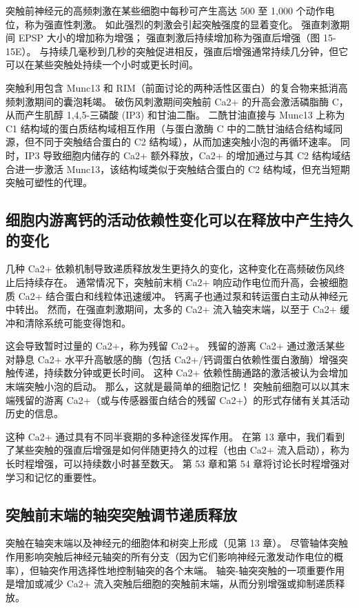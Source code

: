 突触前神经元的高频刺激在某些细胞中每秒可产生高达 500 至 1,000 个动作电位，称为强直性刺激。 如此强烈的刺激会引起突触强度的显着变化。 强直刺激期间 EPSP 大小的增加称为增强； 强直刺激后持续增加称为强直后增强（图 15-15E）。 与持续几毫秒到几秒的突触促进相反，强直后增强通常持续几分钟，但它可以在某些突触处持续一个小时或更长时间。

突触利用包含 Munc13 和 RIM（前面讨论的两种活性区蛋白）的复合物来抵消高频刺激期间的囊泡耗竭。 破伤风刺激期间突触前 Ca2+ 的升高会激活磷脂酶 C，从而产生肌醇 1,4,5-三磷酸 (IP3) 和甘油二酯。 二酰甘油直接与 Munc13 上称为 C1 结构域的蛋白质结构域相互作用（与蛋白激酶 C 中的二酰甘油结合结构域同源，但不同于突触结合蛋白的 C2 结构域），从而加速突触小泡的再循环速率。 同时，IP3 导致细胞内储存的 Ca2+ 额外释放，Ca2+ 的增加通过与其 C2 结构域结合进一步激活 Munc13，该结构域类似于突触结合蛋白的 C2 结构域，但充当短期突触可塑性的代理。

\subsection{细胞内游离钙的活动依赖性变化可以在释放中产生持久的变化}
几种 Ca2+ 依赖机制导致递质释放发生更持久的变化，这种变化在高频破伤风终止后持续存在。 通常情况下，突触前末梢 Ca2+ 响应动作电位而升高，会被细胞质 Ca2+ 结合蛋白和线粒体迅速缓冲。 钙离子也通过泵和转运蛋白主动从神经元中转出。 然而，在强直刺激期间，太多的 Ca2+ 流入轴突末端，以至于 Ca2+ 缓冲和清除系统可能变得饱和。

这会导致暂时过量的 Ca2+，称为残留 Ca2+。 残留的游离 Ca2+ 通过激活某些对静息 Ca2+ 水平升高敏感的酶（包括 Ca2+/钙调蛋白依赖性蛋白激酶）增强突触传递，持续数分钟或更长时间。 这种 Ca2+ 依赖性酶通路的激活被认为会增加末端突触小泡的启动。 那么，这就是最简单的细胞记忆！ 突触前细胞可以以其末端残留的游离 Ca2+（或与传感器蛋白结合的残留 Ca2+）的形式存储有关其活动历史的信息。

这种 Ca2+ 通过具有不同半衰期的多种途径发挥作用。 在第 13 章中，我们看到了某些突触的强直后增强是如何伴随更持久的过程（也由 Ca2+ 流入启动），称为长时程增强，可以持续数小时甚至数天。 第 53 章和第 54 章将讨论长时程增强对学习和记忆的重要性。

\subsection{突触前末端的轴突突触调节递质释放}
突触在轴突末端以及神经元的细胞体和树突上形成（见第 13 章）。 尽管轴体突触作用影响突触后神经元轴突的所有分支（因为它们影响神经元激发动作电位的概率），但轴突作用选择性地控制轴突的各个末端。 轴突-轴突突触的一项重要作用是增加或减少 Ca2+ 流入突触后细胞的突触前末端，从而分别增强或抑制递质释放。


